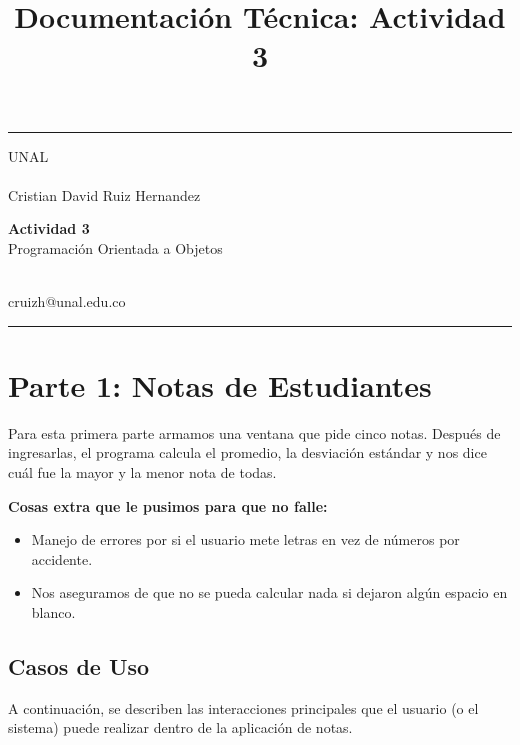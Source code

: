 \documentclass[a4paper,11pt]{article}
\begin{document}

\title{Documentación Técnica: Actividad 3} 
\fancyhead[C]{}
\hrule \medskip 
\begin{minipage}{0.4\textwidth} 
\raggedright
UNAL\\ 
\footnotesize 
\hfill\\
Cristian David Ruiz Hernandez
\end{minipage}
\begin{minipage}{0.4\textwidth} 
\centering 
\large 
\textbf{Actividad 3}\\ 
\normalsize 
Programación Orientada a Objetos \\ 
\end{minipage}
\begin{minipage}{0.18\textwidth} 
\raggedleft
\footnotesize 
\hfill\\
cruizh@unal.edu.co 
\end{minipage}
\medskip\hrule 
\bigskip


\section{Parte 1: Notas de Estudiantes}
Para esta primera parte armamos una ventana que pide cinco notas. Después de ingresarlas, el programa calcula el promedio, la desviación estándar y nos dice cuál fue la mayor y la menor nota de todas.

\textbf{Cosas extra que le pusimos para que no falle:}
\begin{itemize}
 \item Manejo de errores por si el usuario mete letras en vez de números por accidente.
 \item Nos aseguramos de que no se pueda calcular nada si dejaron algún espacio en blanco.
\end{itemize}

\subsection{Casos de Uso}
A continuación, se describen las interacciones principales que el usuario (o el sistema) puede realizar dentro de la aplicación de notas.
\end{document}
